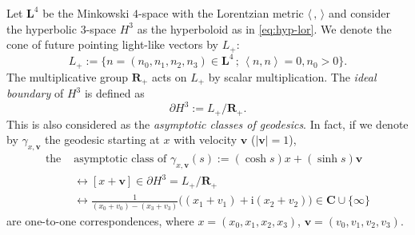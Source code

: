 \documentclass[a4paper]{amsart}
\theoremstyle{plain}
\theoremstyle{remark}
\numberwithin{equation}{section}
\begin{document}
Let ${\boldsymbol{L}}^4$ be the Minkowski $4$-space with the Lorentzian metric
$\langle \, , \, \rangle$ and consider the hyperbolic $3$-space $H^3$ 
as the hyperboloid as in \eqref{eq:hyp-lor}.
We denote the cone of future pointing light-like vectors by $L_+$:
\[
   L_+:=\{n=(n_0,n_1,n_2,n_3)\in {\boldsymbol{L}}^4\,;\,{\left\langle{{n}},{{n}}\right\rangle}=0,n_0>0\}.
\]
The multiplicative group ${\boldsymbol{R}}_+$ acts on $L_+$ by scalar multiplication.
The {\em ideal boundary\/} of $H^3$ is defined as
\begin{equation*}
 \partial H^3:= L_+/{\boldsymbol{R}}_+.
\end{equation*}
This is also considered as the {\em asymptotic classes of geodesics}.
In fact, if we denote by $\gamma_{x,{\boldsymbol{{v}}}}$ the geodesic
starting at $x$ with velocity ${\boldsymbol{{v}}}$ ($|{\boldsymbol{{v}}}|=1$), 
\begin{equation}\label{eq:asymptotic}
\begin{aligned}
   \text{the }&\text{asymptotic } \text{class of } \gamma_{x,{\boldsymbol{{v}}}}(s)
   :=(\cosh s)x+(\sinh s){\boldsymbol{{v}}}\\
   &\leftrightarrow
   [x+{\boldsymbol{{v}}}]\in \partial H^3=L_+/{\boldsymbol{R}}_+\\
   &\leftrightarrow
   \frac{1}{(x_0+v_0)-(x_3+v_3)}\bigl((x_1+v_1)+{\mathrm{i}}(x_2+v_2)\bigr)
   \in {\boldsymbol{C}}\cup\{\infty\}
\end{aligned}
\end{equation}
are  one-to-one correspondences,
where $x=(x_0,x_1,x_2,x_3)$, ${\boldsymbol{{v}}}=(v_0,v_1,v_2,v_3)$.
\end{document}
